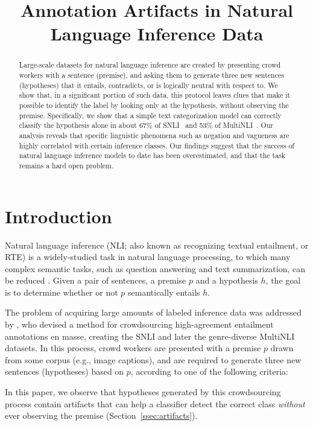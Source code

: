 \title{Annotation Artifacts in Natural Language Inference Data}

\begin{abstract}
Large-scale datasets for natural language inference are created by presenting crowd workers with a sentence (premise), and asking them to generate three new sentences (hypotheses) that it entails, contradicts, or is logically neutral with respect to. We show that, in a significant portion of such data, this protocol leaves clues that make it possible to identify the label by looking only at the hypothesis, without observing the premise. Specifically, we show that a simple text categorization model can correctly classify the hypothesis alone in about 67\% of SNLI~\cite{Bowman:2015} and 53\% of MultiNLI~\cite{Williams:2017}. Our analysis reveals that specific linguistic phenomena such as negation and vagueness are highly correlated with certain inference classes. Our findings suggest that the success of natural language inference models to date has been overestimated, and that the task remains a hard open problem.
\end{abstract}

\section{Introduction}

Natural language inference (NLI; also known as recognizing textual entailment, or RTE) is a widely-studied task in natural language processing, to which many complex semantic tasks, such as question answering and text summarization, can be reduced \cite{Dagan:2006}. Given a pair of sentences, a premise $p$ and a hypothesis $h$, the goal is to determine whether or not $p$ semantically entails $h$.

The problem of acquiring large amounts of labeled inference data was addressed by \citet{Bowman:2015}, who devised a method for crowdsourcing high-agreement entailment annotations en masse, creating the SNLI and later the genre-diverse MultiNLI \cite{Williams:2017} datasets. In this process, crowd workers are presented with a premise $p$ drawn from some corpus (e.g., image captions), and are required to generate three new sentences (hypotheses) based on $p$, according to one of the following criteria:

In this paper, we observe that hypotheses generated by this crowdsourcing process contain artifacts that can help a classifier detect the correct class \textit{without} ever observing the premise (Section~\ref{ssec:artifacts}).

